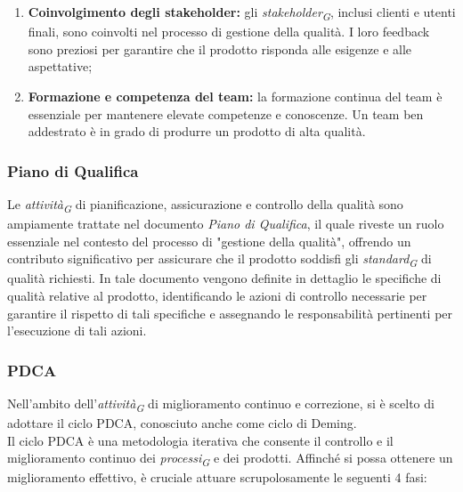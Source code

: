 \begin{enumerate}
    \item \textbf{Coinvolgimento degli stakeholder:}
        gli \textit{stakeholder}\textsubscript{\textit{G}}, inclusi clienti e utenti finali, sono coinvolti nel processo di gestione della qualità. I loro feedback sono preziosi per garantire che il prodotto risponda alle esigenze e alle aspettative;

    \item \textbf{Formazione e competenza del team:}
        la formazione continua del team è essenziale per mantenere elevate competenze e conoscenze. Un team ben addestrato è in grado di produrre un prodotto di alta qualità.
\end{enumerate}

\subsubsection{Piano di Qualifica}

Le \textit{attività}\textsubscript{\textit{G}} di pianificazione, assicurazione e controllo della qualità sono ampiamente trattate nel documento \textit{Piano di Qualifica}, il quale riveste un ruolo essenziale nel contesto del processo di "gestione della qualità", offrendo un contributo significativo per assicurare che il prodotto soddisfi gli \textit{standard}\textsubscript{\textit{G}} di qualità richiesti. In tale documento vengono definite in dettaglio le specifiche di qualità relative al prodotto, identificando le azioni di controllo necessarie per garantire il rispetto di tali specifiche e assegnando le responsabilità pertinenti per l'esecuzione di tali azioni.

\subsubsection{PDCA}
Nell'ambito dell'\textit{attività}\textsubscript{\textit{G}} di miglioramento continuo e correzione, si è scelto di adottare il ciclo PDCA, conosciuto anche come ciclo di Deming. \\
Il ciclo PDCA è una metodologia iterativa che consente il controllo e il miglioramento continuo dei \textit{processi}\textsubscript{\textit{G}} e dei prodotti. Affinché si possa ottenere un miglioramento effettivo, è cruciale attuare scrupolosamente le seguenti 4 fasi:

